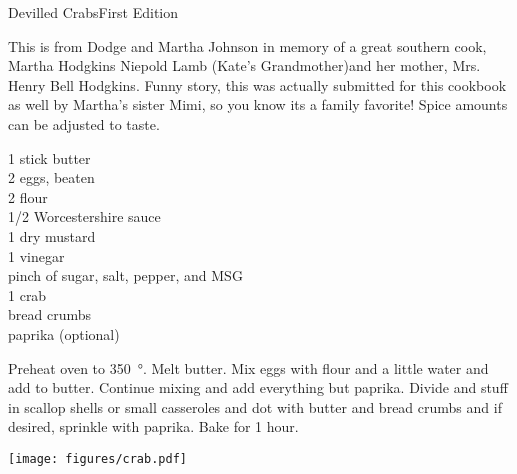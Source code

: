 \begin{entry}{Devilled Crabs}{First Edition}

\begin{open}
  This is from Dodge and Martha Johnson in memory of a great southern cook, Martha Hodgkins Niepold Lamb (Kate's Grandmother)and her mother, Mrs. Henry Bell Hodgkins. Funny story, this was actually submitted for this cookbook as well by Martha's sister Mimi, so you know its a family favorite! Spice amounts can be adjusted to taste.
\end{open}
\begin{ingredients}
  1 stick butter\\
  2 eggs, beaten\\
  \SI{2}{\tblspoon} flour\\
  \SI{1/2}{\teaspoon} Worcestershire sauce\\
  \SI{1}{\teaspoon} dry mustard\\
  \SI{1}{\tblspoon} vinegar\\
  pinch of sugar, salt, pepper, and MSG\\
  \SI{1}{\pound} crab\\
  bread crumbs \\
  paprika (optional) \\ 
\end{ingredients}
Preheat oven to \SI{350}{\degree}.  Melt butter. Mix eggs with flour and a little water and add
to butter. Continue mixing and add everything but paprika. Divide and stuff in scallop shells or
small casseroles and dot with butter and bread crumbs and if desired, sprinkle with paprika. Bake for 1 hour.
\begin{center}
    \texttt{[image: figures/crab.pdf]}
\end{center}
\end{entry}

